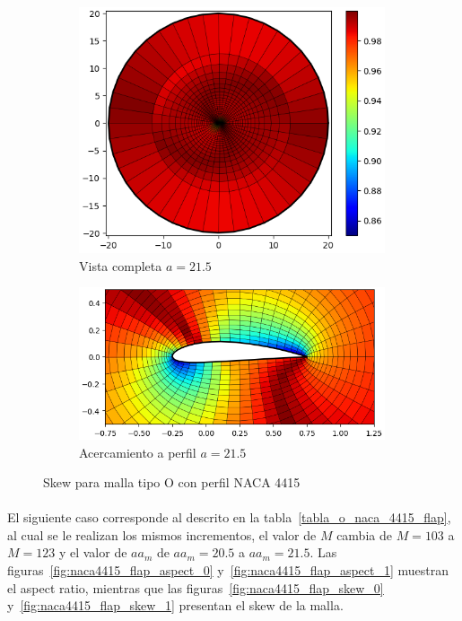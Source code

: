 \documentclass[letterpaper, openright, 12pt]{book}
\begin{document}
\begin{figure}[htbp!]
\begin{subfigure}[c]{0.48\textwidth}
            \includegraphics[keepaspectratio,
                width=0.99\textwidth]{./img/naca4415_aa_215_skew_far}
            \caption{Vista completa $a=21.5$}
            \label{fig:naca4415_aa_215_skew_far}
        \end{subfigure}
        \hfill
        \begin{subfigure}[c]{0.48\textwidth}
            \includegraphics[keepaspectratio,
                width=0.99\textwidth]{./img/naca4415_aa_215_skew_close}
            \caption{Acercamiento a perfil $a = 21.5$}
            \label{fig:naca4415_aa_215_skew_close}
        \end{subfigure}
        \caption{Skew para malla tipo O con perfil NACA 4415}
        \label{fig:naca4415_skew_1}
    \end{figure}

    \paragraph*{}
    El siguiente caso corresponde al descrito en la
    tabla~\ref{tabla_o_naca_4415_flap}, al cual se le realizan los mismos
    incrementos, el valor de $M$ cambia de $M=103$ a $M=123$ y el valor de
    $aa_m$ de $aa_m = 20.5$ a $aa_m = 21.5$. Las
    figuras~\ref{fig:naca4415_flap_aspect_0} y~\ref{fig:naca4415_flap_aspect_1}
    muestran el aspect ratio, mientras que las
    figuras~\ref{fig:naca4415_flap_skew_0} y~\ref{fig:naca4415_flap_skew_1}
    presentan el skew de la malla.
\end{document}
